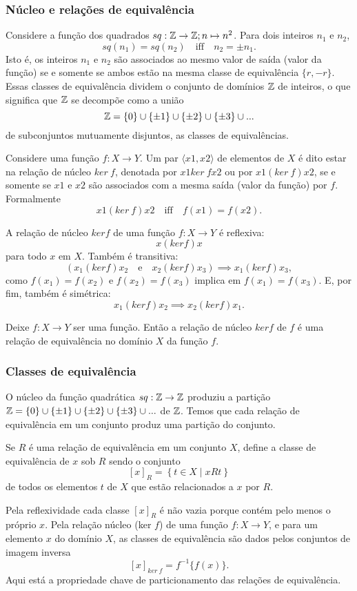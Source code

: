 \subsubsection{Núcleo e relações de equivalência}
Considere a função dos quadrados $sq: \mathbb{Z} \to \mathbb{Z}; n\mapsto n^{2}$. Para dois inteiros $n_{1}$ e $n_{2}$, $$sq(n_{1}) = sq(n_{2})\quad \textrm{iff}\quad n_{2} = \pm n_{1}.$$
Isto é, os inteiros $n_{1}$ e $n_{2}$ são associados ao mesmo valor de saída (valor da função) se e somente se ambos estão na mesma classe de equivalência $\{r, -r\}$. Essas classes de equivalência dividem o conjunto de domínios $\mathbb{Z}$ de inteiros, o que significa que $\mathbb{Z}$ se decompõe como a união 
$$ \mathbb{Z} = \{0\} \cup \{\pm 1\} \cup \{\pm 2\} \cup \{\pm 3\} \cup ...$$
de subconjuntos mutuamente disjuntos, as classes de equivalências.
\begin{definition}
  Considere uma função $f: X \to Y$. Um par $\langle x{1}, x{2} \rangle$ de elementos de $X$ é dito estar na relação de núcleo $ker\ f$, denotada por $x{1} ker\ f x{2}$ ou por $x{1} (ker\ f) x{2}$, se e somente se $x{1}$ e $x{2}$ são associados com a mesma saída (valor da função) por $f$. Formalmente
  $$ x{1} (ker\ f) x{2}\quad \textrm{iff}\quad f(x{1}) = f(x{2}).$$
\end{definition}
A relação de núcleo $ker f$ de uma função $f: X \to Y$ é reflexiva: $$ x (ker f) x$$ para todo $x$ em $X$. Também é transitiva: $$\left(x_{1} (ker f) x_{2}\quad \textrm{e}\quad x_{2} (ker f) x_{3}\right) \implies x_{1} (ker f) x_{3},$$ como $f(x_{1}) = f(x_{2})$ e $f(x_{2}) = f(x_{3})$ implica em $f(x_{1}) = f(x_{3}).$ E, por fim, também é simétrica: $$ x_{1} (ker f) x_{2} \implies x_{2} (ker f) x_{1}.$$
\begin{stat}
  Deixe $f: X \to Y$ ser uma função. Então a relação de núcleo $ker f$ de $f$ é uma relação de equivalência no domínio $X$ da função $f$.
\end{stat}

\subsubsection{Classes de equivalência}
O núcleo da função quadrática $sq: \mathbb{Z} \to \mathbb{Z}$ produziu a partição $ \mathbb{Z} = \{0\} \cup \{\pm 1\} \cup \{\pm 2\} \cup \{\pm 3\} \cup ...$ de $\mathbb{Z}$. Temos que cada relação de equivalência em um conjunto produz uma partição do conjunto.

\begin{definition}
  Se $R$ é uma relação de equivalência em um conjunto $X$, define a classe de equivalência de $x$ sob $R$ sendo o conjunto $$ \left[x\right]_{R} = \left\{t \in X \mid x R t\right\}$$ de todos os elementos $t$ de $X$ que estão relacionados a $x$ por $R$.
\end{definition}
Pela reflexividade cada classe $\left[x\right]_{R}$ é não vazia porque contém pelo menos o próprio $x$. Pela relação núcleo (ker $f$) de uma função $f: X\to Y$, e para um elemento $x$ do domínio $X$, as classes de equivalência são dados pelos conjuntos de imagem inversa $$\left[x\right]_{ker\ f} = f^{-1}\{f(x)\}.$$ Aqui está a propriedade chave de particionamento das relações de equivalência.

